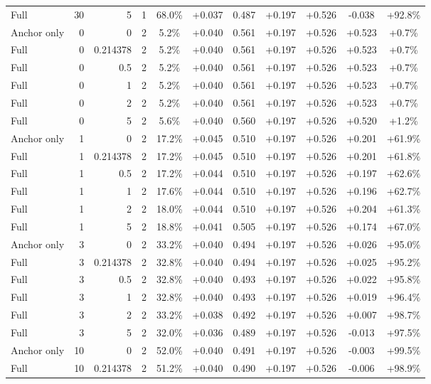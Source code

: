 \begin{table}[htbp]
\begin{tabular}{lrrrccccccc}
Full & 30 & 5 & 1 & 68.0\% & +0.037 & 0.487 & +0.197 & +0.526 & -0.038 & +92.8\% \\
Anchor only & 0 & 0 & 2 & 5.2\% & +0.040 & 0.561 & +0.197 & +0.526 & +0.523 & +0.7\% \\
Full & 0 & 0.214378 & 2 & 5.2\% & +0.040 & 0.561 & +0.197 & +0.526 & +0.523 & +0.7\% \\
Full & 0 & 0.5 & 2 & 5.2\% & +0.040 & 0.561 & +0.197 & +0.526 & +0.523 & +0.7\% \\
Full & 0 & 1 & 2 & 5.2\% & +0.040 & 0.561 & +0.197 & +0.526 & +0.523 & +0.7\% \\
Full & 0 & 2 & 2 & 5.2\% & +0.040 & 0.561 & +0.197 & +0.526 & +0.523 & +0.7\% \\
Full & 0 & 5 & 2 & 5.6\% & +0.040 & 0.560 & +0.197 & +0.526 & +0.520 & +1.2\% \\
Anchor only & 1 & 0 & 2 & 17.2\% & +0.045 & 0.510 & +0.197 & +0.526 & +0.201 & +61.9\% \\
Full & 1 & 0.214378 & 2 & 17.2\% & +0.045 & 0.510 & +0.197 & +0.526 & +0.201 & +61.8\% \\
Full & 1 & 0.5 & 2 & 17.2\% & +0.044 & 0.510 & +0.197 & +0.526 & +0.197 & +62.6\% \\
Full & 1 & 1 & 2 & 17.6\% & +0.044 & 0.510 & +0.197 & +0.526 & +0.196 & +62.7\% \\
Full & 1 & 2 & 2 & 18.0\% & +0.044 & 0.510 & +0.197 & +0.526 & +0.204 & +61.3\% \\
Full & 1 & 5 & 2 & 18.8\% & +0.041 & 0.505 & +0.197 & +0.526 & +0.174 & +67.0\% \\
Anchor only & 3 & 0 & 2 & 33.2\% & +0.040 & 0.494 & +0.197 & +0.526 & +0.026 & +95.0\% \\
Full & 3 & 0.214378 & 2 & 32.8\% & +0.040 & 0.494 & +0.197 & +0.526 & +0.025 & +95.2\% \\
Full & 3 & 0.5 & 2 & 32.8\% & +0.040 & 0.493 & +0.197 & +0.526 & +0.022 & +95.8\% \\
Full & 3 & 1 & 2 & 32.8\% & +0.040 & 0.493 & +0.197 & +0.526 & +0.019 & +96.4\% \\
Full & 3 & 2 & 2 & 33.2\% & +0.038 & 0.492 & +0.197 & +0.526 & +0.007 & +98.7\% \\
Full & 3 & 5 & 2 & 32.0\% & +0.036 & 0.489 & +0.197 & +0.526 & -0.013 & +97.5\% \\
Anchor only & 10 & 0 & 2 & 52.0\% & +0.040 & 0.491 & +0.197 & +0.526 & -0.003 & +99.5\% \\
Full & 10 & 0.214378 & 2 & 51.2\% & +0.040 & 0.490 & +0.197 & +0.526 & -0.006 & +98.9\% \\

\end{tabular}
\end{table}
